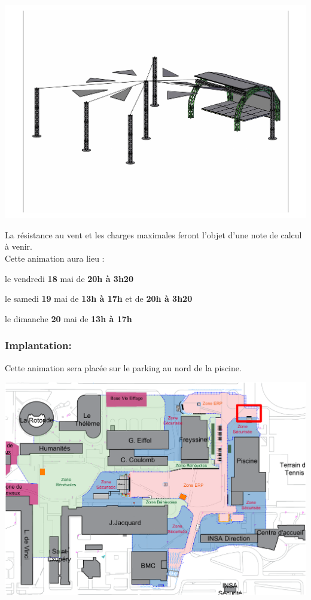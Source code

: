 \documentclass[hidelinks, paper=a4, fontsize=13pt]{report}
\begin{document}
\begin{center}
	\includegraphics[width=.8\textwidth,keepaspectratio]{Annexes/Images/Totems}
\end{center}

La résistance au vent et les charges maximales feront l'objet d'une note de calcul à venir.\\

Cette animation aura lieu :
\begin{list}{•}{}
	\item le vendredi \textbf{18} mai de \textbf{20h à 3h20}
	\item le samedi \textbf{19} mai de \textbf{13h à 17h} et de \textbf{20h à 3h20}
	\item le dimanche \textbf{20} mai de \textbf{13h à 17h}
\end{list}

\subsubsection{Implantation:}
Cette animation sera placée sur le parking au nord de la piscine.
\begin{center}
	\includegraphics[width=.8\textwidth,keepaspectratio]{Exports/Plan_24h_44eme-3e_Scene}
\end{center}
\end{document}
